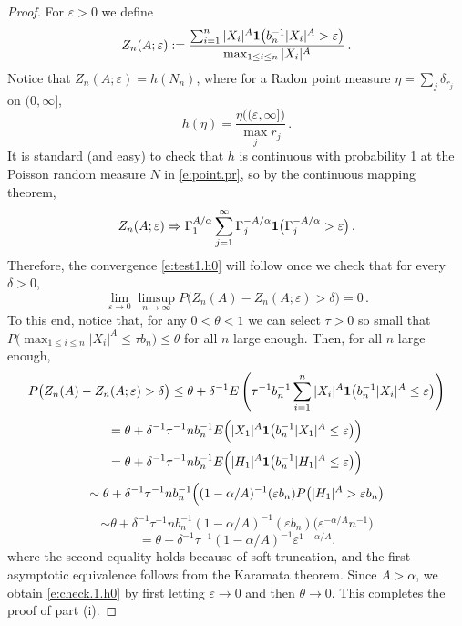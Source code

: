 \documentclass[11pt]{amsart}
\numberwithin{equation}{section}
\begin{document}
\begin{proof}
For ${\varepsilon}>0$ we define
$$
Z_n(A;{\varepsilon}):=\frac{\sum_{i=1}^n|X_i|^A{{\bf 1}}\bigl( b_n^{-1}|X_i|^A>{\varepsilon}
  \bigr)}{\max_{1\le i\le n}|X_i|^A}\,.
$$
Notice that $Z_n(A;{\varepsilon}) = h(N_n)$, where for a Radon point measure
$\eta= \sum_j \delta_{r_j}$ on $(0,\infty]$,
$$
h(\eta) = \frac{\eta\bigl( ({\varepsilon},\infty]\bigr)}{\max_j r_j}\,.
$$
It is standard (and easy) to check that $h$ is continuous with
probability 1 at the Poisson random measure $N$ in \eqref{e:point.pr},
so by the continuous mapping theorem,
$$
Z_n(A;{\varepsilon}) \Rightarrow \Gamma_1^{A/\alpha}
\sum_{j=1}^\infty \Gamma_j^{-A/\alpha}{{\bf 1}}\bigl(
\Gamma_j^{-A/\alpha}>{\varepsilon}\bigr)\,.
$$
Therefore, the convergence  \eqref{e:test1.h0} will follow once we
check that for every $\delta>0$,
\begin{equation} \label{e:check.1.h0}
\lim_{{\varepsilon}\to 0}\limsup_{n\to\infty} P\bigl( Z_n(A) -
Z_n(A;{\varepsilon})>\delta\bigr)= 0\,.
\end{equation}
To this end, notice that, for any $0<\theta<1$ we can select $\tau>0$
so small that $P\bigl( \max_{1\le i\le n}|X_i|^A\leq \tau b_n\bigr)\leq
\theta$ for all $n$ large enough. Then, for all $n$ large enough,
$$
P\bigl( Z_n(A) - Z_n(A;{\varepsilon})>\delta\bigr) \leq \theta
+ \delta^{-1} E\left( \tau^{-1} b_n^{-1} \sum_{i=1}^n|X_i|^A{{\bf 1}}\bigl(
  b_n^{-1}|X_i|^A\leq {\varepsilon}   \bigr)\right)
$$
$$
= \theta + \delta^{-1} \tau^{-1} nb_n^{-1} E\Bigl( |X_1|^A{{\bf 1}}\bigl(
  b_n^{-1}|X_1|^A\leq {\varepsilon}   \bigr)\Bigr)
$$
$$
= \theta + \delta^{-1} \tau^{-1} nb_n^{-1} E\Bigl( |H_1|^A{{\bf 1}}\bigl(
  b_n^{-1}|H_1|^A\leq {\varepsilon}   \bigr)\Bigr)
$$
$$
\sim \theta + \delta^{-1} \tau^{-1} nb_n^{-1}\Bigl( (1-\alpha/A)^{-1}
({\varepsilon} b_n) P\bigl( |H_1|^A > {\varepsilon} b_n\bigr)
$$
$$
\sim \theta + \delta^{-1} \tau^{-1} nb_n^{-1} (1-\alpha/A)^{-1}
({\varepsilon} b_n) \bigl( {\varepsilon}^{-\alpha/A}n^{-1}\bigr)
$$
$$
= \theta + \delta^{-1} \tau^{-1} (1-\alpha/A)^{-1} {\varepsilon}^{1-\alpha/A}.
$$
where the second equality holds because of soft truncation, and
the first asymptotic equivalence follows from the Karamata
theorem. Since $A>\alpha$, we obtain \eqref{e:check.1.h0} by first
letting ${\varepsilon}\to 0$ and then $\theta\to 0$. This completes the proof
of part (i).


\end{proof}
\end{document}
